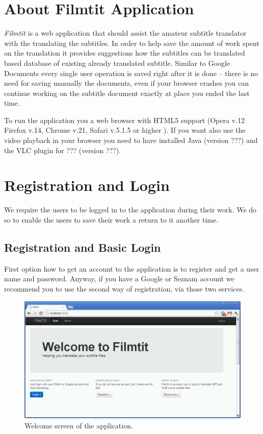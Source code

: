 \label{chap:users_manual}

\section{About Filmtit Application}

\emph{Filmtit} is a web application that should assist the amateur subtitle translator with the translating the subtitles. In order to help save the amount of work spent on the translation it provides suggestions how the subtitles can be translated based database of existing already translated subtitle. Similar to Google Documents every single user operation is saved right after it is done -- there is no need for saving manually the documents, even if your browser crashes you can continue working on the subtitle document exactly at place you ended the last time.

To run the application you a web browser with HTML5 support (Opera v.12
Firefox v.14, Chrome v.21, Safari v.5.1.5 or higher ). If you want also use the video playback in your browser you need to have installed Java (version ???) and the VLC plugin for ??? (version ???).

\section{Registration and Login}

We require the users to be logged in to the application during their work. We do so to enable the users to save their work a return to it another time. 

\subsection{Registration and Basic Login}

First option how to get an account to the application is to register and get a user name and password. Anyway, if you have a Google or Seznam account we recommend you to use the second way of registration, via those two services.

\begin{figure}
\begin{center}
\includegraphics[scale=0.4]{figures/user_manual/welcome_screen.png}
\end{center}
\caption{Welcome screen of the application.}
\label{fig:welcome}
\end{figure}

